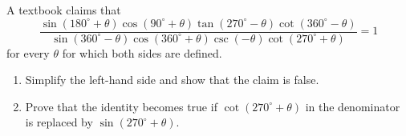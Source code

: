 A textbook claims that
\[\dfrac{\sin(180^\circ+\theta)\cos(90^\circ+\theta)\tan(270^\circ-\theta)\cot(360^\circ-\theta)}{\sin(360^\circ-\theta)\cos(360^\circ+\theta)\csc(-\theta)\cot(270^\circ+\theta)}=1\]
for every $\theta$ for which both sides are defined.
\begin{enumerate}
\item[(a)] Simplify the left-hand side and show that the claim is false.
\item[(b)] Prove that the identity becomes true if $\cot(270^\circ+\theta)$ in the denominator is replaced by $\sin(270^\circ+\theta)$.
\end{enumerate}
